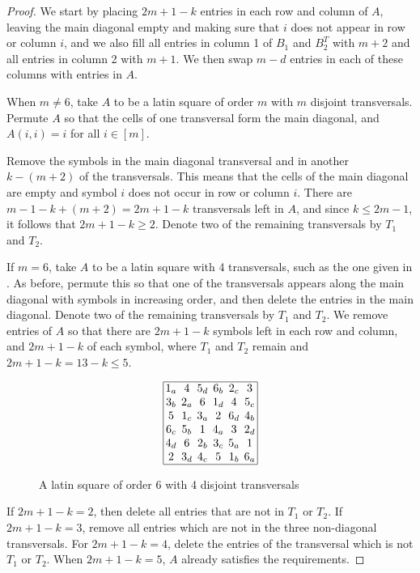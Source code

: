 \documentclass[preprint,nonatbib]{elsarticle}
\theoremstyle{definition}
\numberwithin{equation}{section}
\begin{document}
\begin{proof}
    We start by placing $2m+1-k$ entries in each row and column of $A$, leaving the main diagonal empty and making sure that $i$ does not appear in row or column $i$, and we also fill all entries in column 1 of $B_1$ and $B_2^T$ with $m+2$ and all entries in column 2 with $m+1$. We then swap $m-d$ entries in each of these columns with entries in $A$.

    When $m\neq 6$, take $A$ to be a latin square of order $m$ with $m$ disjoint transversals. Permute $A$ so that the cells of one transversal form the main diagonal, and $A(i,i) = i$ for all $i\in[m]$.

    Remove the symbols in the main diagonal transversal and in another $k-(m+2)$ of the transversals. This means that the cells of the main diagonal are empty and symbol $i$ does not occur in row or column $i$. There are $m-1-k+(m+2) = 2m+1-k$ transversals left in $A$, and since $k\leq 2m-1$, it follows that $2m+1-k \geq 2$. Denote two of the remaining transversals by $T_1$ and $T_2$.

    If $m=6$, take $A$ to be a latin square with 4 transversals, such as the one given in . As before, permute this so that one of the transversals appears along the main diagonal with symbols in increasing order, and then delete the entries in the main diagonal. Denote two of the remaining transversals by $T_1$ and $T_2$. We remove entries of $A$ so that there are $2m+1-k$ symbols left in each row and column, and $2m+1-k$ of each symbol, where $T_1$ and $T_2$ remain and $2m+1-k = 13-k\leq 5$.

\begin{figure}[h]
    \centering
    $$\arraycolsep=2pt\begin{array}{|cccccc|}\hline
        1_a & 4 & 5_d & 6_b & 2_c & 3 \\
        3_b & 2_a & 6 & 1_d & 4 & 5_c \\
        5 & 1_c & 3_a & 2 & 6_d & 4_b \\
        6_c & 5_b & 1 & 4_a & 3 & 2_d \\
        4_d & 6 & 2_b & 3_c & 5_a & 1 \\
        2 & 3_d & 4_c & 5 & 1_b & 6_a \\ \hline
    \end{array}$$
    \caption{A latin square of order 6 with 4 disjoint transversals}
    \label{fig: order 6 square with 4 transversals}
\end{figure}
    
    If $2m+1-k = 2$, then delete all entries that are not in $T_1$ or $T_2$. If $2m+1-k = 3$, remove all entries which are not in the three non-diagonal transversals. For $2m+1-k = 4$, delete the entries of the transversal which is not $T_1$ or $T_2$. When $2m+1-k = 5$, $A$ already satisfies the requirements.


\end{proof}
\end{document}
